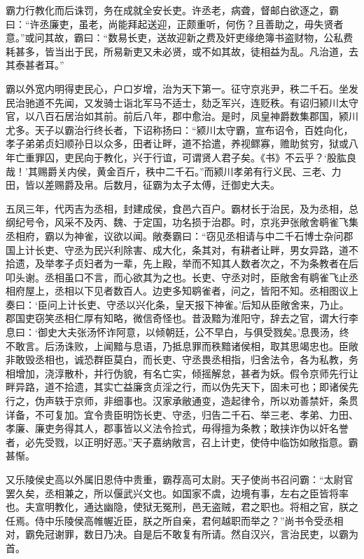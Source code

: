 \documentclass[12pt,UTF8]{ctexbook}
\begin{document}
霸力行教化而后诛罚，务在成就全安长吏。许丞老，病聋，督邮白欲逐之，霸曰：“许丞廉吏，虽老，尚能拜起送迎，正颇重听，何伤？且善助之，毋失贤者意。”或问其故，霸曰：“数易长吏，送故迎新之费及奸吏缘绝簿书盗财物，公私费耗甚多，皆当出于民，所易新吏又未必贤，或不如其故，徒相益为乱。凡治道，去其泰甚者耳。”



霸以外宽内明得吏民心，户口岁增，治为天下第一。征守京兆尹，秩二千石。坐发民治驰道不先闻，又发骑士诣北军马不适士，劾乏军兴，连贬秩。有诏归颍川太守官，以八百石居治如其前。前后八年，郡中愈治。是时，凤皇神爵数集郡国，颍川尤多。天子以霸治行终长者，下诏称扬曰：“颍川太守霸，宣布诏令，百姓向化，孝子弟弟贞妇顺孙日以众多，田者让畔，道不拾遣，养视鳏寡，赡助贫穷，狱或八年亡重罪囚，吏民向于教化，兴于行谊，可谓贤人君子矣。《书》不云乎？‘股肱良哉！’其赐爵关内侯，黄金百斤，秩中二千石。”而颍川孝弟有行义民、三老、力田，皆以差赐爵及帛。后数月，征霸为太子太傅，迁御史大夫。



五凤三年，代丙吉为丞相，封建成侯，食邑六百户。霸材长于治民，及为丞相，总纲纪号令，风采不及丙、魏、于定国，功名损于治郡。时，京兆尹张敞舍鹖雀飞集丞相府，霸以为神雀，议欲以闻。敞奏霸曰：“窃见丞相请与中二千石博士杂问郡国上计长吏、守丞为民兴利除害、成大化，条其对，有耕者让畔，男女异路，道不拾遗，及举孝子贞妇者为一辈，先上殿，举而不知其人数者次之，不为条教者在后叩头谢。丞相虽口不言，而心欲其为之也。长吏、守丞对时，臣敞舍有鹖雀飞止丞相府屋上，丞相以下见者数百人。边吏多知鹖雀者，问之，皆阳不知。丞相图议上奏曰：‘臣问上计长吏、守丞以兴化条，皇天报下神雀。’后知从臣敞舍来，乃止。郡国吏窃笑丞相仁厚有知略，微信奇怪也。昔汲黯为淮阳守，辞去之官，谓大行李息曰：‘御史大夫张汤怀诈阿意，以倾朝廷，公不早白，与俱受戮矣。’息畏汤，终不敢言。后汤诛败，上闻黯与息语，乃抵息罪而秩黯诸侯相，取其思竭忠也。臣敞非敢毁丞相也，诚恐群臣莫白，而长吏、守丞畏丞相指，归舍法令，各为私教，务相增加，浇淳散朴，并行伪貌，有名亡实，倾摇解怠，甚者为妖。假令京师先行让畔异路，道不拾遗，其实亡益廉贪贞淫之行，而以伪先天下，固未可也；即诸侯先行之，伪声轶于京师，非细事也。汉家承敝通变，造起律令，所以劝善禁奸，条贯详备，不可复加。宜令贵臣明饬长吏、守丞，归告二千石、举三老、孝弟、力田、孝廉、廉吏务得其人，郡事皆以义法令捡式，毋得擅为条教；敢挟诈伪以奸名誉者，必先受戮，以正明好恶。”天子嘉纳敞言，召上计吏，使侍中临饬如敞指意。霸甚惭。



又乐陵侯史高以外属旧恩侍中贵重，霸荐高可太尉。天子使尚书召问霸：“太尉官罢久矣，丞相兼之，所以偃武兴文也。如国家不虞，边境有事，左右之臣皆将率也。夫宣明教化，通达幽隐，使狱无冤刑，邑无盗贼，君之职也。将相之官，朕之任焉。侍中乐陵侯高帷幄近臣，朕之所自亲，君何越职而举之？”尚书令受丞相对，霸免冠谢罪，数日乃决。自是后不敢复有所请。然自汉兴，言治民吏，以霸为首。
\end{document}
